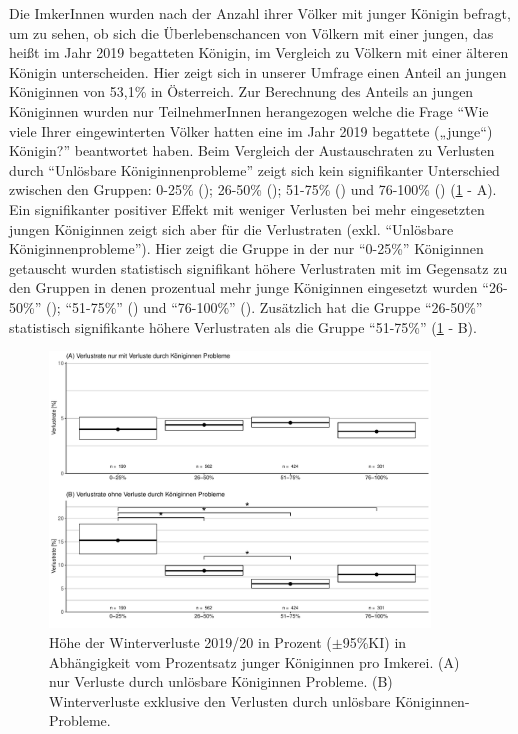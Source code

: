 \label{ss:junge_koeniginnen:U}

Die ImkerInnen wurden nach der Anzahl ihrer Völker mit junger Königin befragt, um zu sehen, ob sich die Überlebenschancen von Völkern mit einer jungen, das heißt im Jahr 2019 begatteten Königin, im Vergleich zu Völkern mit einer älteren Königin unterscheiden. Hier zeigt sich in unserer Umfrage einen Anteil an jungen Königinnen von 53,1\% in Österreich. Zur Berechnung des Anteils an jungen Königinnen wurden nur TeilnehmerInnen herangezogen welche die Frage \enquote{Wie viele Ihrer eingewinterten Völker hatten eine im Jahr 2019 begattete („junge``) Königin?} beantwortet haben.
\newline
Beim Vergleich der Austauschraten zu Verlusten durch \enquote{Unlösbare Königinnenprobleme} zeigt sich kein signifikanter Unterschied zwischen den Gruppen: 0-25\% (); 26-50\% (); 51-75\% () und 76-100\% () (\cref{fig:u:queen:exchangerate} - A).
\newline
Ein signifikanter positiver Effekt mit weniger Verlusten bei mehr eingesetzten jungen Königinnen zeigt sich aber für die Verlustraten (exkl. \enquote{Unlösbare Königinnenprobleme}). Hier zeigt die Gruppe in der nur \enquote{0-25\%} Königinnen getauscht wurden statistisch signifikant höhere Verlustraten mit  im Gegensatz zu den Gruppen in denen prozentual mehr junge Königinnen eingesetzt wurden \enquote{26-50\%} (); \enquote{51-75\%} () und \enquote{76-100\%} (). Zusätzlich hat die Gruppe \enquote{26-50\%} statistisch signifikante höhere Verlustraten als die Gruppe \enquote{51-75\%} (\cref{fig:u:queen:exchangerate} - B).

\begin{figure}[H]
  \centering
  \includegraphics[keepaspectratio,width=0.9\textwidth]{project-U-wintersterblichkeit/figures/plot_queen_exchangerate}
  \caption{Höhe der Winterverluste 2019/20 in Prozent ($\pm$95\%KI) in Abhängigkeit vom Prozentsatz junger Königinnen pro Imkerei. (A) nur Verluste durch unlösbare Königinnen Probleme. (B) Winterverluste exklusive den Verlusten durch unlösbare Königinnen-Probleme.}
  \label{fig:u:queen:exchangerate}
\end{figure}

